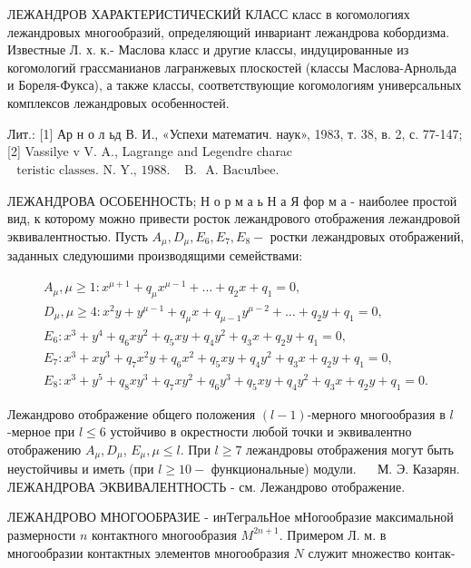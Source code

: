 \documentclass[10pt]{article}
\begin{document}
ЛЕЖАНДРОВ ХАРАКТЕРИСТИЧЕСКИЙ КЛАСС класс в когомологиях лежандровых многообразий, определяющий инвариант лежандрова кобордизма. Известные Л. х. к.- Маслова класс и другие классы, индуцированные из когомологий грассманианов лагранжевых плоскостей (классы Маслова-Арнольда и Бореля-Фукса), а также классы, соответствующие когомологиям универсальных комплексов лежандровых особенностей.



Лит.: [1] Ар н о л ьд В. И., «Успехи математич. наук», 1983, т. 38, в. 2, с. 77-147; [2] Vassilye v V. A., Lagrange and Legendre charac$\begin{array}{ll}\text { teristic classes. N. Y., } 1988 . & \text { B. } \text { A. Bacuлbee. }\end{array}$



ЛЕЖАНДРОВА ОСОБЕННОСТЬ; Н о р м а ь Н а Я фор м а - наиболее простой вид, к которому можно привести росток лежандрового отображения лежандровой эквивалентностью. Пусть $A_{\mu}, D_{\mu}, E_{6}, E_{7}, E_{8}-$ ростки лежандровых отображений, заданных следуюшими производящими семействами:



\[

\begin{gathered}

A_{\mu}, \mu \geqslant 1: x^{\mu+1}+q_{\mu} x^{\mu-1}+\ldots+q_{2} x+q_{1}=0, \\

D_{\mu}, \mu \geqslant 4: x^{2} y+y^{\mu-1}+q_{\mu} x+q_{\mu-1} y^{\mu-2}+\ldots+q_{2} y+q_{1}=0, \\

E_{6}: x^{3}+y^{4}+q_{6} x y^{2}+q_{5} x y+q_{4} y^{2}+q_{3} x+q_{2} y+q_{1}=0, \\

E_{7}: x^{3}+x y^{3}+q_{7} x^{2} y+q_{6} x^{2}+q_{5} x y+q_{4} y^{2}+q_{3} x+q_{2} y+q_{1}=0, \\

E_{8}: x^{3}+y^{5}+q_{8} x y^{3}+q_{7} x y^{2}+q_{6} y^{3}+q_{5} x y+q_{4} y^{2}+q_{3} x+q_{2} y+q_{1}=0 .

\end{gathered}

\]



Лежандрово отображение общего положения $(l-1)$-мерного многообразия в $l$-мерное при $l \leqslant 6$ устойчиво в окрестности любой точки и эквивалентно отображению $A_{\mu}, D_{\mu}$, $E_{\mu}, \mu \leqslant l$. При $l \geqslant 7$ лежандровы отображения могут быть неустойчивы и иметь (при $l \geqslant 10-$ функциональные) модули. $\quad$ М. Э. Казарян. ЛЕЖАНДРОВА ЭКВИВАЛЕНТНОСТЬ - см. Лежандрово отображение.



ЛЕЖАНДРОВО МНОГООБРАЗИЕ - инТегральНое мНогообразие максимальной размерности $n$ контактного многообразия $M^{2 n+1}$. Примером Л. м. в многообразии контактных элементов многообразия $N$ служит множество контак-
\end{document}
